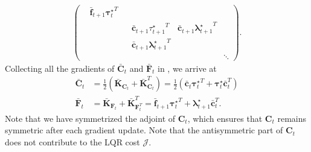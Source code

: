 \documentclass[a4paper,11pt]{article}
\renewcommand\b\bm
\begin{document}
\begin{align}
\begin{pmatrix}
               & \bar{\b{f}}_{t+1} {\b{\tau}_t^\star}^T &                                       &                                              &                                               &        \\
               &                                        &                                       & \bar{\b{c}}_{t+1}{\tau_{t+1}^\star}^T        & \bar{\b{c}}_{t+1} {\b{\lambda}_{t+1}^\star}^T &        \\
               &                                        &                                       & \bar{\b{c}}_{t+1}{\b{\lambda}_{t+1}^\star}^T &                                               &        \\
               &                                        &                                       &                                              &                                               & \ddots
    \end{pmatrix}.
\end{align}
%
Collecting all the gradients of $\bar{\b{C}}_t$ and $\bar{\b{F}}_t$ in , we arrive at
%
\begin{align}
    \bar{\b{C}}_t & = \frac{1}{2} ({\bar{\b{K}}_{\b{C}_t}} + \bar{\b{K}}_{\b{C}_t}^T)
    = \frac12 (\bar{\b{c}}_t {\b{\tau}_t^\star}^T + \b{\tau}_t^\star \bar{\b{c}}_t^T) \\
    \bar{\b{F}}_t & = \bar{\b{K}}_{\b{F}_t} + \bar{\b{K}}_{\b{F}_t^T}^T
    =  \bar{\b{f}}_{t+1} {\b{\tau}_t^\star}^T + \b{\lambda}_{t+1}^\star \bar{\b{c}}_t^T.
\end{align}
%
Note that we have symmetrized the adjoint of $\b{C}_t$, which ensures that $\b{C}_t$ remains symmetric after each gradient update.
Note that the antisymmetric part of $\b{C}_t$ does not contribute to the LQR cost $\mathcal{J}$.
\end{document}
